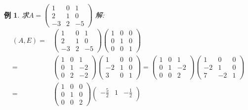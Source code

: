 \documentclass[12pt, a4paper, oneside]{ctexbook}
\newtheorem{example}[theorem]{例}
\begin{document}
\begin{example}
    求$A=\begin{pmatrix}
        1 & 0 & 1 \\
        2 & 1 & 0 \\
        -3 & 2 & -5
    \end{pmatrix}$
    \newline
    解: $$\begin{aligned}
        (A, E)=&\begin{pmatrix}
            1 & 0 & 1 \\
            2 & 1 & 0 \\
            -3 & 2 & -5
        \end{pmatrix} \begin{pmatrix}
            1 & 0 & 0 \\
            0 & 1 & 0 \\
            0 & 0 & 1
        \end{pmatrix} \\
        =&\begin{pmatrix}
            1 & 0 & 1 \\
            0 & 1 & -2 \\
            0 & 2 & -2
        \end{pmatrix} \begin{pmatrix}
            1 & 0 & 0 \\
            -2 & 1 & 0 \\
            3 & 0 & 1
        \end{pmatrix} = \begin{pmatrix}
            1 & 0 & 1 \\
            0 & 1 & -2 \\
            0 & 0 & 2
        \end{pmatrix} \begin{pmatrix}
            1 & 0 & 0 \\
            -2 & 1 & 0 \\
            7 & -2 & 1
        \end{pmatrix} \\
        =&\begin{pmatrix}
            1 & 0 & 0 \\
            0 & 1 & 0 \\
            0 & 0 & 2
        \end{pmatrix} \begin{pmatrix}
            -\frac{5}{2} & 1 & -\frac{1}{2} \\

\end{pmatrix}
\end{aligned}$$
\end{example}
\end{document}
